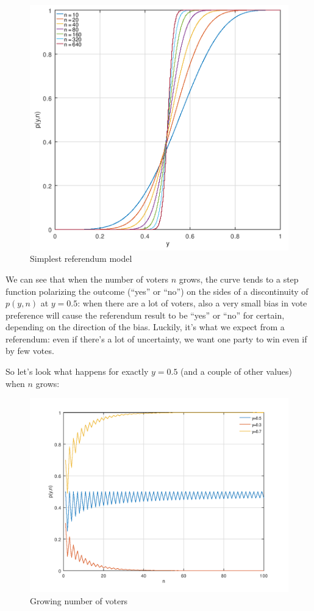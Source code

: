 \documentclass[10pt,a4paper]{article}
\begin{document}
	\begin{figure}[H]
		\centering
		\includegraphics[height=0.33\textheight]{FIG/simplest.png}
		\caption{Simplest referendum model}
		\label{fig:simplest}
	\end{figure}	
	We can see that when the number of voters $n$ grows, the curve tends to a step function polarizing the outcome (\enquote{yes} or \enquote{no}) on the sides of a discontinuity of $p(y,n)$ at $y=0.5$: when there are a lot of voters, also a very small bias in vote preference will cause the referendum result to be \enquote{yes} or \enquote{no} for certain, depending on the direction of the bias. Luckily, it’s what we expect from a referendum: even if there’s a lot of uncertainty, we want one party to win even if by few votes.
	
	So let’s look what happens for exactly $y=0.5$ (and a couple of other values) when $n$ grows:
	\begin{figure}[H]	
		\centering
		\includegraphics[height=0.33\textheight]{FIG/growing.png}
		\caption{Growing number of voters}
		\label{fig:growing}
	\end{figure}
	
\end{document}
